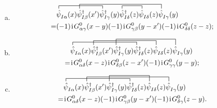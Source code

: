 \begin{enumerate}[(a)]
\item 
\begin{align}
&\contraction[1ex]{}
{\hat{\psi}}
{^{}_{I \alpha}(x)\hat{\psi}_{I \beta}^{\dagger}(x^{\prime})}
{\hat{\psi}}
\contraction[1.5ex]{\hat{\psi}^{}_{I \alpha}(x)}
{\hat{\psi}}
{_{I \beta}^{\dagger}(x^{\prime})\hat{\psi}_{I \gamma}^{\dagger}(y)
\hat{\psi}_{I \delta}^{\dagger}(z)
\hat{\psi}^{}_{I \delta}(z)}
{\hat{\psi}}
\contraction[1ex]{\hat{\psi}^{}_{I \alpha}(x)
\hat{\psi}_{I \beta}^{\dagger}(x^{\prime})
\hat{\psi}_{I \gamma}^{\dagger}(y)}
{\hat{\psi}}
{_{I \delta}^{\dagger}(z)}
{\hat{\psi}}
\hat{\psi}^{}_{I \alpha}(x)
\hat{\psi}_{I \beta}^{\dagger}(x^{\prime})
\hat{\psi}_{I \gamma}^{\dagger}(y)
\hat{\psi}_{I \delta}^{\dagger}(z)
\hat{\psi}^{}_{I \delta}(z)
\hat{\psi}^{}_{I \gamma}(y)\nonumber\\
=&(-1)\ii G_{\alpha\gamma}^{0}(x-y)(-1)\ii G_{\gamma\beta}^{0}(y-x')(-1)\ii G_{\delta\delta}^{0}(z-z);
\end{align}

\item 
\begin{align}
&\contraction[1ex]{}
{\hat{\psi}}
{^{}_{I \alpha}(x)\hat{\psi}_{I \beta}^{\dagger}(x^{\prime})
\hat{\psi}_{I \gamma}^{\dagger}(y)}
{\hat{\psi}}
\contraction[1.5ex]{\hat{\psi}^{}_{I \alpha}(x)}
{\hat{\psi}}
{_{I \beta}^{\dagger}(x^{\prime})\hat{\psi}_{I \gamma}^{\dagger}(y)
\hat{\psi}_{I \delta}^{\dagger}(z)}
{\hat{\psi}}
\contraction[2ex]{\hat{\psi}^{}_{I \alpha}(x)
\hat{\psi}_{I \beta}^{\dagger}(x^{\prime})}
{\hat{\psi}}
{_{I \gamma}^{\dagger}(y)\hat{\psi}_{I \delta}^{\dagger}(z)
\hat{\psi}^{}_{I \delta}(z)}
{\hat{\psi}}
\hat{\psi}^{}_{I \alpha}(x)
\hat{\psi}_{I \beta}^{\dagger}(x^{\prime})
\hat{\psi}_{I \gamma}^{\dagger}(y)
\hat{\psi}_{I \delta}^{\dagger}(z)
\hat{\psi}^{}_{I \delta}(z)
\hat{\psi}^{}_{I \gamma}(y)\nonumber\\
=&\ii G_{\alpha\delta}^{0}(x-z)\ii G_{\delta\beta}^{0}(z-x')(-1)\ii G_{\gamma\gamma}^{0}(y-y);
\end{align}

\item 
\begin{align}
&\contraction[1ex]{}
{\hat{\psi}}
{^{}_{I \alpha}(x)\hat{\psi}_{I \beta}^{\dagger}(x^{\prime})
\hat{\psi}_{I \gamma}^{\dagger}(y)}
{\hat{\psi}}
\contraction[1.5ex]{\hat{\psi}^{}_{I \alpha}(x)}
{\hat{\psi}}
{_{I \beta}^{\dagger}(x^{\prime})\hat{\psi}_{I \gamma}^{\dagger}(y)
\hat{\psi}_{I \delta}^{\dagger}(z)
\hat{\psi}^{}_{I \delta}(z)}
{\hat{\psi}}
\contraction[2ex]{\hat{\psi}^{}_{I \alpha}(x)
\hat{\psi}_{I \beta}^{\dagger}(x^{\prime})}
{\hat{\psi}}
{_{I \gamma}^{\dagger}(y)\hat{\psi}_{I \delta}^{\dagger}(z)}
{\hat{\psi}}
\hat{\psi}^{}_{I \alpha}(x)
\hat{\psi}_{I \beta}^{\dagger}(x^{\prime})
\hat{\psi}_{I \gamma}^{\dagger}(y)
\hat{\psi}_{I \delta}^{\dagger}(z)
\hat{\psi}^{}_{I \delta}(z)
\hat{\psi}^{}_{I \gamma}(y)\nonumber\\
=&\ii G_{\alpha\delta}^{0}(x-z)(-1)\ii G_{\gamma\beta}^{0}(y-x')(-1)\ii G_{\delta\gamma}^{0}(z-y).
\end{align}
\end{enumerate}
